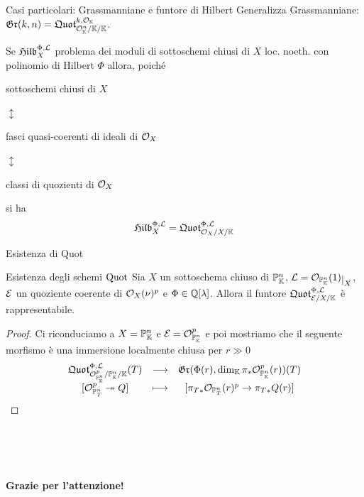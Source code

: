 \documentclass[a4paper]{beamer}
\begin{document}
\begin{frame}{Casi particolari: Grassmanniane e funtore di Hilbert}
Generalizza Grassmanniane: $\mathfrak{Gr}(k,n)=\mathfrak{Quot}^{k,\mathcal{O}_{\mathbb{K}}}_{\mathcal{O}_{\mathbb{K}}^n/\mathbb{K}/\mathbb{K}}$.\pause
\bigskip

Se $\mathfrak{Hilb}^{\Phi,\mathcal{L}}_X$ problema dei moduli di sottoschemi chiusi di $X$ loc. noeth. con polinomio di Hilbert $\Phi$ allora, poich\'e
\begin{center}
sottoschemi chiusi di $X$ 

$\updownarrow$ 

fasci quasi-coerenti di ideali di $\mathcal{O}_X$ 

$\updownarrow$ 

classi di quozienti di $\mathcal{O}_X$
\end{center}
si ha
\[\mathfrak{Hilb}^{\Phi,\mathcal{L}}_X=\mathfrak{Quot}^{\Phi,\mathcal{L}}_{\mathcal{O}_X/X/\mathbb{K}}\]

\end{frame}

\begin{frame}{Esistenza di Quot}
\begin{alertblock}{Esistenza degli schemi $\mathrm{Quot}$}
Sia $X$ un sottoschema chiuso di $\mathbb{P}^n_{\mathbb{K}}$, $\Lc=\Oc_{\Pj^n_\K}(1)\res X$, $\mathcal{E}$ un quoziente coerente di $\mathcal{O}_{X}(\nu)^p$ e $\Phi\in\mathbb{Q}[\lambda]$. Allora il funtore $\mathfrak{Quot}^{\Phi,\mathcal{L}}_{\mathcal{E}/X/\mathbb{K}}$ \`e rappresentabile. 
\end{alertblock}
\pause
\begin{proof}
Ci riconduciamo a $X=\mathbb{P}^n_{\mathbb{K}}$ e $\mathcal{E}=\mathcal{O}^p_{\mathbb{P}^n_{\mathbb{K}}}$ e poi mostriamo che il seguente morfismo \`e una immersione localmente chiusa per $r\gg0$
\[\begin{array}{ccc} {\mathfrak{Quot}^{\Phi,\mathcal{L}}_{\mathcal{O}^p_{\mathbb{P}^n_{\mathbb{K}}}/\mathbb{P}^n_{\mathbb{K}}/\mathbb{K}}(T)} & \longrightarrow & {\mathfrak{Gr}(\Phi(r),\dim_{\mathbb{K}}\pi_\ast\mathcal{O}^p_{\mathbb{P}^n_{\mathbb{K}}}(r))(T)}\\ {[\mathcal{O}^p_{\mathbb{P}^n_T}\twoheadrightarrow Q]} & \longmapsto & {[{\pi_T}_\ast\mathcal{O}_{\mathbb{P}^n_T}(r)^p\to {\pi_T}_\ast Q(r)]} \end{array}\]
\end{proof}
~\\~\\~
\end{frame}




\begin{frame}
\begin{center}
{\huge \textbf{Grazie per l'attenzione!}}
\end{center}
\end{frame}
\end{document}
